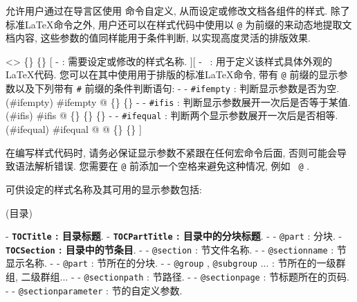 
\SimpleSystemTeX 允许用户通过在导言区使用  命令自定义, 从而设定或修改文档各组件的样式. 除了标准\LaTeX 命令之外, 用户还可以在样式代码中使用以 \texttt{@} 为前缀的来动态地提取文档内容, 这些参数的值同样能用于条件判断, 以实现高度灵活的排版效果.

<>{
    \{\}
    \{\longarg\}
}[
    -  : 需要设定或修改的样式名称.
][
    - \longarg\ : 用于定义该样式具体外观的\LaTeX 代码. 您可以在其中使用用于排版的标准\LaTeX 命令, 带有 \texttt{@} 前缀的显示参数以及下列带有 \texttt{\#} 前缀的条件判断语句:
        - - \texttt{\#ifempty} : 判断显示参数是否为空.
        (\#ifempty){
            \upshape
            \#ifempty
            @
            \{\longarg\}
            \{\longarg\}
        }
        - - \texttt{\#ifis} : 判断显示参数展开一次后是否等于某值.
        (\#ifis){
            \upshape
            \#ifis
            @
            \{\}
            \{\longarg\}
            \{\longarg\}
        }
        - - \texttt{\#ifequal} : 判断两个显示参数展开一次后是否相等.
        (\#ifequal){
            \upshape
            \#ifequal
            @
            @
            \{\longarg\}
            \{\longarg\}
        }
]

在编写样式代码时, 请务必保证显示参数不紧跟在任何宏命令后面, 否则可能会导致语法解析错误. 您需要在 \texttt{@} 前添加一个空格来避免这种情况, 例如 \texttt{ @} .

\newpage 可供设定的样式名称及其可用的显示参数包括:

(\large 目录){
    \par\medskip{}
    - \textbf{\texttt{TOCTitle} : 目录标题}.
    - \textbf{\texttt{TOCPartTitle} : 目录中的分块标题}.
        - - \texttt{@part} : 分块.
    - \textbf{\texttt{TOCSection} : 目录中的节条目}.
        - - \texttt{@section} : 节文件名称.
        - - \texttt{@sectionname} : 节显示名称.
        - - \texttt{@part} : 节所在的分块.
        - - \texttt{@group} , \texttt{@subgroup} ... : 节所在的一级群组, 二级群组...
        - - \texttt{@sectionpath} : 节路径.
        - - \texttt{@sectionpage} : 节标题所在的页码.
        - - \texttt{@sectionparameter} : 节的自定义参数.
}

